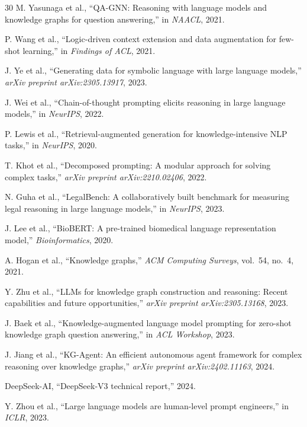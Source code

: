 \documentclass[12pt,a4paper]{article}
\begin{document}
\begin{thebibliography}{30}
M. Yasunaga et al., ``QA-GNN: Reasoning with language models and knowledge graphs for question answering,'' in \textit{NAACL}, 2021.

P. Wang et al., ``Logic-driven context extension and data augmentation for few-shot learning,'' in \textit{Findings of ACL}, 2021.

J. Ye et al., ``Generating data for symbolic language with large language models,'' \textit{arXiv preprint arXiv:2305.13917}, 2023.

J. Wei et al., ``Chain-of-thought prompting elicits reasoning in large language models,'' in \textit{NeurIPS}, 2022.

P. Lewis et al., ``Retrieval-augmented generation for knowledge-intensive NLP tasks,'' in \textit{NeurIPS}, 2020.

T. Khot et al., ``Decomposed prompting: A modular approach for solving complex tasks,'' \textit{arXiv preprint arXiv:2210.02406}, 2022.

N. Guha et al., ``LegalBench: A collaboratively built benchmark for measuring legal reasoning in large language models,'' in \textit{NeurIPS}, 2023.

J. Lee et al., ``BioBERT: A pre-trained biomedical language representation model,'' \textit{Bioinformatics}, 2020.

A. Hogan et al., ``Knowledge graphs,'' \textit{ACM Computing Surveys}, vol.~54, no.~4, 2021.

Y. Zhu et al., ``LLMs for knowledge graph construction and reasoning: Recent capabilities and future opportunities,'' \textit{arXiv preprint arXiv:2305.13168}, 2023.

J. Baek et al., ``Knowledge-augmented language model prompting for zero-shot knowledge graph question answering,'' in \textit{ACL Workshop}, 2023.

J. Jiang et al., ``KG-Agent: An efficient autonomous agent framework for complex reasoning over knowledge graphs,'' \textit{arXiv preprint arXiv:2402.11163}, 2024.

DeepSeek-AI, ``DeepSeek-V3 technical report,'' 2024.

Y. Zhou et al., ``Large language models are human-level prompt engineers,'' in \textit{ICLR}, 2023.


\end{thebibliography}
\end{document}
